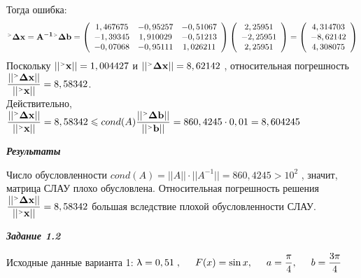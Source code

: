 \documentclass[12pt]{article}
\begin{document}
Тогда ошибка:
\begin{equation*}
\mathbf{^{\mathsmaller{>}} \Delta x=A^{-1} {}^\mathsmaller{>} \Delta b} = 
	\left(
\begin{array}{ccc}
	1,467675 & -0,95257 & -0,51067 \\
	-1,39345 & 1,910029 & -0,51213 \\
	-0,07068 & -0,95111	& 1,026211 \\
\end{array}
\right)
\left(
\begin{array}{c}
	2,25951\\
	-2,25951\\
	2,25951\\
\end{array}
\right)
=
\left(
\begin{array}{c}
	4,314703\\
	-8,62142\\
	4,308075\\
\end{array}
\right)
\end{equation*}
Поскольку $||\mathbf{^{\mathsmaller{>}} x}|| = 1,004427$ и 
$||\mathbf{^{\mathsmaller{>}} \Delta x}|| = 8, 62142$ , относительная погрешность $\dfrac{||\mathbf{^{\mathsmaller{>}} \Delta x}||}{||\mathbf{^{\mathsmaller{>}} x}||} = 8,58342$. \\
Действительно, $\dfrac{||\mathbf{^{\mathsmaller{>}} \Delta x}||}{||\mathbf{^{\mathsmaller{>}} x}||} = 8,58342 \leqslant cond(A) 
\dfrac{||\mathbf{^{\mathsmaller{>}} \Delta b}||}{||\mathbf{^{\mathsmaller{>}} b}||} = 
860,4245 \cdot 0,01 = 8,604245$
\begin{center}
	\textbf{\textit{Результаты}}
\end{center}
Число обусловленности $cond\left(A\right)=||A|| \cdot ||A^{-1}|| = 860,4245 > 10^2 $ , значит, матрица СЛАУ плохо
обусловлена. Относительная погрешность решения $\dfrac{||\mathbf{^{\mathsmaller{>}} \Delta x}||}{||\mathbf{^{\mathsmaller{>}} x}||} = 8,58342 $ большая
вследствие плохой обусловленности СЛАУ.

\begin{center}
	\textbf{\textit{Задание 1.2}}
\end{center}
Исходные данные варианта 1: $\uplambda=0,51 \hspace{0.1cm} , \hspace{0.5cm}  F(x)=\sin{x},
\hspace{0.5cm} a=\dfrac{\pi}{4},
\hspace{0.5cm} b=\dfrac{3\pi}{4}$ \\ 
\end{document}
